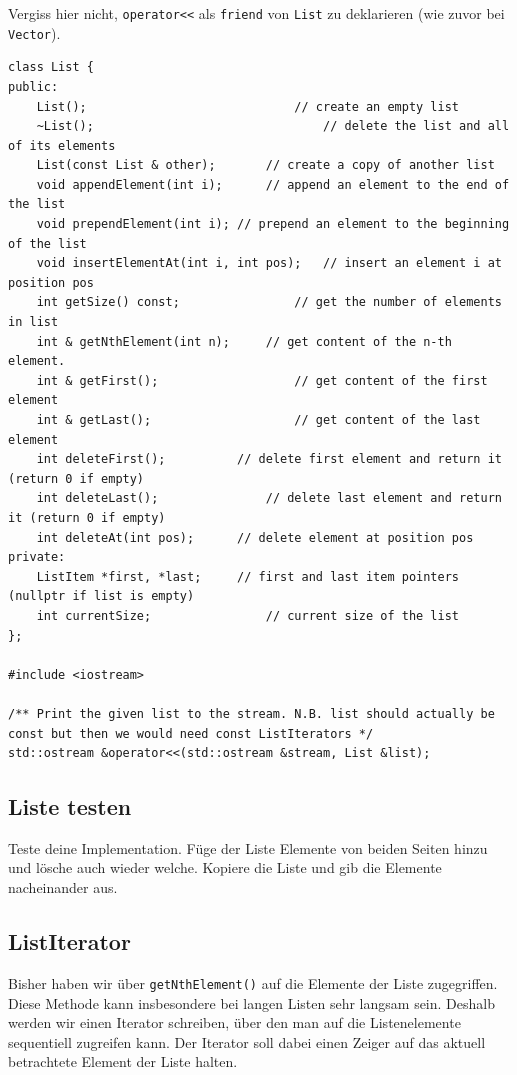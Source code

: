 Vergiss hier nicht, \lstinline{operator<<} als \lstinline{friend} von \lstinline{List} zu deklarieren (wie zuvor bei \lstinline{Vector}).

\begin{lstlisting}
class List {
public:
	List();								// create an empty list
	~List();								// delete the list and all of its elements
	List(const List & other);		// create a copy of another list
	void appendElement(int i);		// append an element to the end of the list
	void prependElement(int i);	// prepend an element to the beginning of the list
	void insertElementAt(int i, int pos);	// insert an element i at position pos
	int getSize() const;				// get the number of elements in list
	int & getNthElement(int n);		// get content of the n-th element.
	int & getFirst();					// get content of the first element
	int & getLast();					// get content of the last element
	int deleteFirst();			// delete first element and return it (return 0 if empty)
	int deleteLast();				// delete last element and return it (return 0 if empty)
	int deleteAt(int pos);		// delete element at position pos
private:
	ListItem *first, *last;		// first and last item pointers (nullptr if list is empty)
	int currentSize;				// current size of the list
};

#include <iostream>

/** Print the given list to the stream. N.B. list should actually be const but then we would need const ListIterators */
std::ostream &operator<<(std::ostream &stream, List &list);
\end{lstlisting}

\subsection{Liste testen}
Teste deine Implementation.
Füge der Liste Elemente von beiden Seiten hinzu und lösche auch wieder welche.
Kopiere die Liste und gib die Elemente nacheinander aus.

\subsection{ListIterator}
Bisher haben wir über \lstinline{getNthElement()} auf die Elemente der Liste zugegriffen.
Diese Methode kann insbesondere bei langen Listen sehr langsam sein.
Deshalb werden wir einen Iterator schreiben, über den man auf die Listenelemente sequentiell zugreifen kann.
Der Iterator soll dabei einen Zeiger auf das aktuell betrachtete Element der Liste halten.

